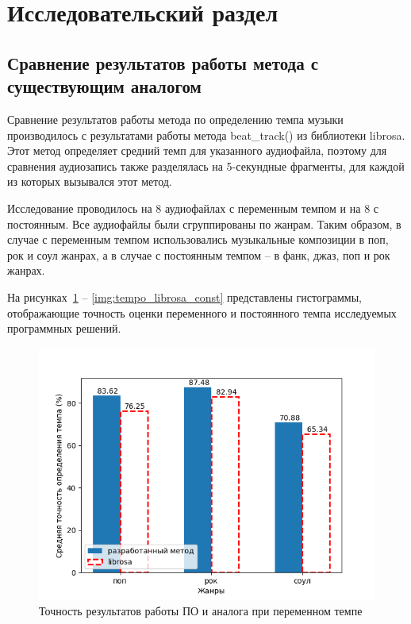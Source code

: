 \section{Исследовательский раздел}
\setcounter{figure}{0}
\setcounter{table}{0}

\subsection{Сравнение результатов работы метода с существующим аналогом}

Сравнение результатов работы метода по определению темпа музыки производилось с результатами работы метода beat\_track() из библиотеки librosa. Этот метод определяет средний темп для указанного аудиофайла, поэтому для сравнения аудиозапись также разделялась на 5-секундные фрагменты, для каждой из которых вызывался этот метод.

Исследование проводилось на 8 аудиофайлах с переменным темпом и на 8 с постоянным. Все аудиофайлы были сгруппированы по жанрам. Таким образом, в случае с переменным темпом использовались музыкальные композиции в поп, рок и соул жанрах, а в случае с постоянным темпом -- в фанк, джаз, поп и рок жанрах.

На рисунках~\ref{img:tempo_librosa_change} -- \ref{img:tempo_librosa_const} представлены гистограммы, отображающие точность оценки переменного и постоянного темпа исследуемых программных решений.

\begin{figure}[h]
	\centering
	\includegraphics[scale=0.9]{../graphs/changing_tempo_librosa.png}
	\caption{Точность результатов работы ПО и аналога при переменном темпе}
	\label{img:tempo_librosa_change}
\end{figure}

